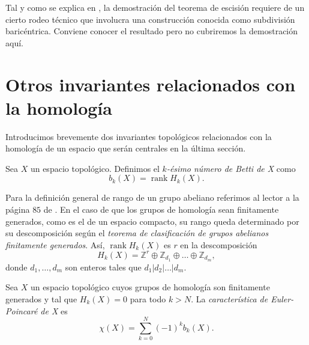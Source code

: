 Tal y como se explica en \cite{hatcher2002}, la demostración del teorema de escisión requiere de un cierto rodeo técnico que involucra una construcción conocida como subdivisión baricéntrica. Conviene conocer el resultado pero no cubriremos la demostración aquí.



\bigskip

\section{Otros invariantes relacionados con la homología}

Introducimos brevemente dos invariantes topológicos relacionados con la homología de un espacio que serán centrales en la última sección.

\begin{definition}
    Sea $X$ un espacio topológico. Definimos el \textit{$k$-ésimo número de Betti de X} como 
    \begin{equation*}
        b_k(X) = \operatorname{rank} H_k(X).
    \end{equation*}
\end{definition}


Para la definición general de rango de un grupo abeliano referimos al lector a la página $85$ de \cite{FuchsInfiniteAbelianGroupsI}. En el caso de que los grupos de homología sean finitamente generados, como es el de un espacio compacto, su rango queda determinado por su descomposición según el \textit{teorema de clasificación de grupos abelianos finitamente generados}. Así, $\operatorname{rank} H_k(X)$ es $r$ en la descomposición
\begin{equation*}
    H_k(X) = \mathbb{Z}^r \oplus \mathbb{Z}_{d_1} \oplus\dots\oplus \mathbb{Z}_{d_m},
\end{equation*}
donde $d_1,\dots,d_m$ son enteros tales que $d_1|d_2|\dots|d_m$.
\bigskip

\begin{definition}
    Sea $X$ un espacio topológico cuyos grupos de homología son finitamente generados y tal que $H_k(X)=0$ para todo $k>N$. La \textit{característica de Euler-Poincaré de X} es 
    \begin{equation*}
        \chi (X) = \sum^N_{k=0} (-1)^k b_k(X).
    \end{equation*}
\end{definition}

